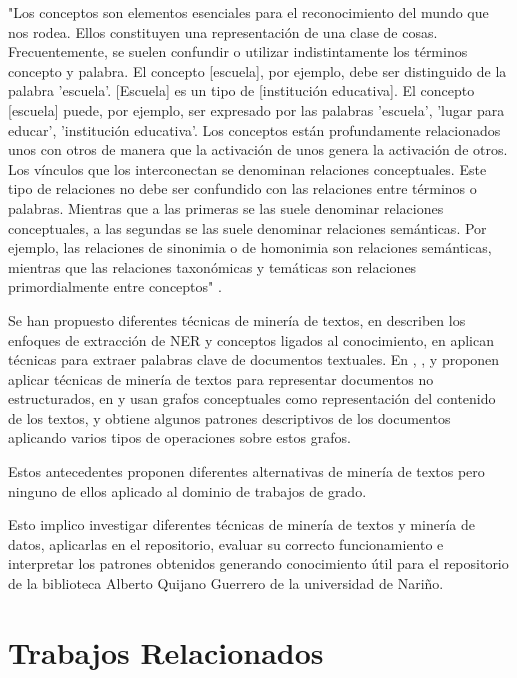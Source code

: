"Los conceptos son elementos esenciales para el reconocimiento del mundo que nos rodea. Ellos constituyen una representación de una clase 
de cosas. Frecuentemente, se suelen confundir o utilizar indistintamente los términos concepto y palabra. El concepto [escuela],
por ejemplo, debe ser distinguido de la palabra 'escuela'. [Escuela] es un tipo de [institución educativa]. El concepto [escuela] puede,
por ejemplo, ser expresado por las palabras 'escuela', 'lugar para educar', 'institución educativa'. 
Los conceptos están profundamente relacionados unos con otros de manera que la activación de unos genera la 
activación de otros. Los vínculos que los interconectan se denominan relaciones conceptuales. Este tipo de relaciones no debe 
ser confundido con las relaciones entre términos o palabras. Mientras que a las primeras se las suele denominar relaciones conceptuales,
a las segundas se las suele denominar relaciones semánticas. Por ejemplo, las relaciones de sinonimia o de homonimia son
relaciones semánticas, mientras que las relaciones taxonómicas y 
temáticas son relaciones primordialmente entre conceptos" \cite{VIVAS2013}.

Se han propuesto diferentes técnicas de minería de textos, en \cite{troyano2003identificacion} 
describen los enfoques de extracción de NER y conceptos ligados al conocimiento, en \cite{figuerola2004algunas}
aplican técnicas para extraer palabras clave de documentos textuales.
En \cite{llorens1998caracteristicas}, \cite{santana2014aplicacion}, \cite{barrera2016mineria} y \cite{rodriguez2018metodos}
proponen aplicar técnicas de minería de textos para representar documentos no estructurados,
en \cite{MONTESYGOMEZ2005} y  \cite{munozutilizacion}
usan grafos conceptuales como representación del contenido de los textos, y obtiene algunos patrones descriptivos de los documentos aplicando varios tipos de operaciones sobre estos grafos.

Estos antecedentes proponen diferentes alternativas de minería de textos pero ninguno de ellos aplicado al dominio de trabajos de grado. 

Esto implico  investigar diferentes técnicas de minería de textos y minería de datos, aplicarlas
en el repositorio, evaluar su correcto funcionamiento e interpretar los patrones obtenidos generando conocimiento
útil para el repositorio de la biblioteca Alberto Quijano Guerrero de la universidad de Nariño.


\section{Trabajos Relacionados}

